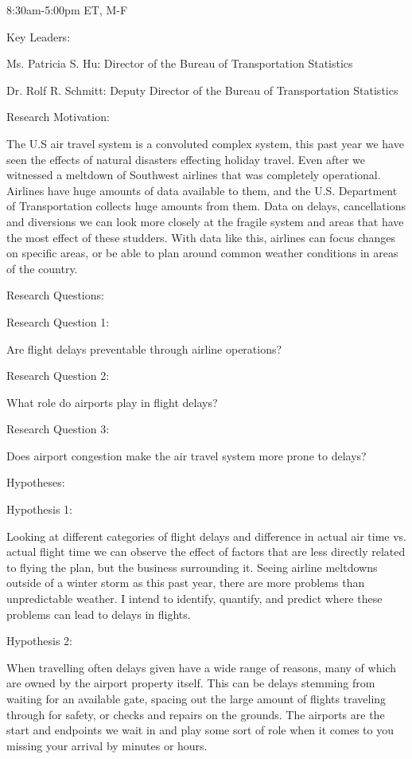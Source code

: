 \documentclass[a4paper,12pt]{article}
\begin{document}
8:30am-5:00pm ET, M-F

Key Leaders:

Ms. Patricia S. Hu: Director of the Bureau of Transportation Statistics

Dr. Rolf R. Schmitt: Deputy Director of the Bureau of Transportation Statistics

Research Motivation:

The U.S air travel system is a convoluted complex system, this past year we have seen the
effects of natural disasters effecting holiday travel. Even after we witnessed a meltdown of
Southwest airlines that was completely operational. Airlines have huge amounts of data
available to them, and the U.S. Department of Transportation collects huge amounts from
them. Data on delays, cancellations and diversions we can look more closely at the fragile
system and areas that have the most effect of these studders. With data like this, airlines can
focus changes on specific areas, or be able to plan around common weather conditions in areas
of the country.

Research Questions:

Research Question 1:

Are flight delays preventable through airline operations?

Research Question 2:

What role do airports play in flight delays?

Research Question 3:

Does airport congestion make the air travel system more prone to delays?

Hypotheses:

Hypothesis 1:

Looking at different categories of flight delays and difference in actual air time vs. actual flight
time we can observe the effect of factors that are less directly related to flying the plan, but the
business surrounding it. Seeing airline meltdowns outside of a winter storm as this past year,
there are more problems than unpredictable weather. I intend to identify, quantify, and predict
where these problems can lead to delays in flights.

Hypothesis 2:

When travelling often delays given have a wide range of reasons, many of which are owned by
the airport property itself. This can be delays stemming from waiting for an available gate,
spacing out the large amount of flights traveling through for safety, or checks and repairs on
the grounds. The airports are the start and endpoints we wait in and play some sort of role
when it comes to you missing your arrival by minutes or hours.
\end{document}
